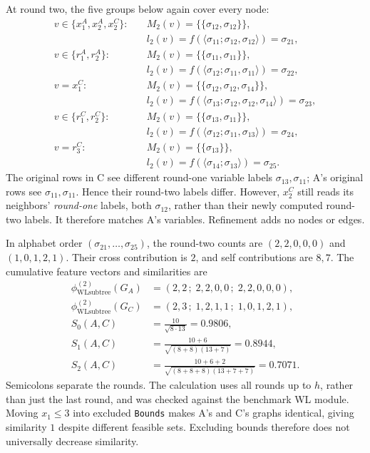 \documentclass[10pt]{article}
\newcommand{\WL}{\mathrm{WLsubtree}}
\begin{document}
At round two, the five groups below again cover every node:
\[
\begin{aligned}
v\in\{x_1^A,x_2^A,x_2^C\}:&
\quad M_2(v)=\{\!\{\sigma_{12},\sigma_{12}\}\!\},\\[-2pt]
&\quad l_2(v)=f(\langle\sigma_{11};\sigma_{12},\sigma_{12}\rangle)
=\sigma_{21},\\
v\in\{r_1^A,r_2^A\}:&
\quad M_2(v)=\{\!\{\sigma_{11},\sigma_{11}\}\!\},\\[-2pt]
&\quad l_2(v)=f(\langle\sigma_{12};\sigma_{11},\sigma_{11}\rangle)
=\sigma_{22},\\
v=x_1^C:&
\quad M_2(v)=\{\!\{\sigma_{12},\sigma_{12},\sigma_{14}\}\!\},\\[-2pt]
&\quad l_2(v)=f(\langle\sigma_{13};
\sigma_{12},\sigma_{12},\sigma_{14}\rangle)=\sigma_{23},\\
v\in\{r_1^C,r_2^C\}:&
\quad M_2(v)=\{\!\{\sigma_{13},\sigma_{11}\}\!\},\\[-2pt]
&\quad l_2(v)=f(\langle\sigma_{12};\sigma_{11},\sigma_{13}\rangle)
=\sigma_{24},\\
v=r_3^C:&
\quad M_2(v)=\{\!\{\sigma_{13}\}\!\},\\[-2pt]
&\quad l_2(v)=f(\langle\sigma_{14};\sigma_{13}\rangle)=\sigma_{25}.
\end{aligned}
\]
The original rows in C see different round-one variable labels
$\sigma_{13},\sigma_{11}$; A's original rows see
$\sigma_{11},\sigma_{11}$. Hence their round-two labels differ.
However, $x_2^C$ still reads its neighbors' \emph{round-one}
labels, both $\sigma_{12}$, rather than their newly computed
round-two labels. It therefore matches A's variables.
Refinement adds no nodes or edges.

In alphabet order $(\sigma_{21},\ldots,\sigma_{25})$, the round-two
counts are $(2,2,0,0,0)$ and $(1,0,1,2,1)$.
Their cross contribution is $2$, and self contributions are $8,7$.
The cumulative feature vectors and similarities are
\[
\begin{aligned}
\phi^{(2)}_{\WL}(G_A)&=(2,2\,;\;2,2,0,0\,;\;2,2,0,0,0),\\
\phi^{(2)}_{\WL}(G_C)&=(2,3\,;\;1,2,1,1\,;\;1,0,1,2,1),\\
S_0(A,C)&=\frac{10}{\sqrt{8\cdot13}}=0.9806,\\
S_1(A,C)&=\frac{10+6}{\sqrt{(8+8)(13+7)}}=0.8944,\\
S_2(A,C)&=\frac{10+6+2}{\sqrt{(8+8+8)(13+7+7)}}=0.7071.
\end{aligned}
\]
Semicolons separate the rounds. The calculation uses all rounds up to
$h$, rather than just the last round, and was checked against the
benchmark WL module. Moving $x_1\leq3$ into excluded \texttt{Bounds}
makes A's and C's graphs identical, giving similarity $1$ despite
different feasible sets. Excluding bounds therefore does not
universally decrease similarity.
\end{document}
